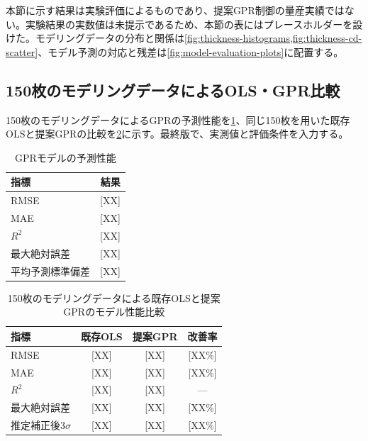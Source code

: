 \documentclass[11pt,a4paper]{ltjsarticle}
\newcommand{\placeholder}[1][XX]{\textcolor{PlaceholderRed}{[#1]}}
\begin{document}
本節に示す結果は実験評価によるものであり、提案GPR制御の量産実績ではない。実験結果の実数値は未提示であるため、本節の表にはプレースホルダーを設けた。モデリングデータの分布と関係は\cref{fig:thickness-histograms,fig:thickness-cd-scatter}、モデル予測の対応と残差は\cref{fig:model-evaluation-plots}に配置する。

\subsection{150枚のモデリングデータによるOLS・GPR比較}

150枚のモデリングデータによるGPRの予測性能を\cref{tab:gpr-performance}、同じ150枚を用いた既存OLSと提案GPRの比較を\cref{tab:model-comparison}に示す。最終版で、実測値と評価条件を入力する。

\begin{table}[tbp]
  \centering
  \caption{GPRモデルの予測性能}
  \label{tab:gpr-performance}
  \begin{tabular}{@{}lr@{}}
    \toprule
    指標 & 結果 \\
    \midrule
    RMSE & \placeholder \\
    MAE & \placeholder \\
    $R^2$ & \placeholder \\
    最大絶対誤差 & \placeholder \\
    平均予測標準偏差 & \placeholder \\
    \bottomrule
  \end{tabular}
\end{table}

\begin{table}[tbp]
  \centering
  \caption{150枚のモデリングデータによる既存OLSと提案GPRのモデル性能比較}
  \label{tab:model-comparison}
  \small
  \begin{tabular}{@{}lccc@{}}
    \toprule
    指標 & 既存OLS & 提案GPR & 改善率 \\
    \midrule
    RMSE & \placeholder & \placeholder & \placeholder[XX\%] \\
    MAE & \placeholder & \placeholder & \placeholder[XX\%] \\
    $R^2$ & \placeholder & \placeholder & --- \\
    最大絶対誤差 & \placeholder & \placeholder & \placeholder[XX\%] \\
    推定補正後3$\sigma$ & \placeholder & \placeholder & \placeholder[XX\%] \\
    \bottomrule
  \end{tabular}
\end{table}
\end{document}
